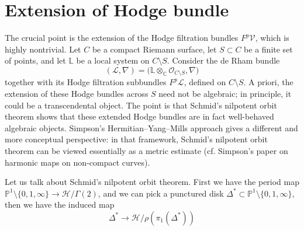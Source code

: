 \documentclass[11pt]{article}
\theoremstyle{definition}
\newtheorem{theorem}{Theorem}
\newcommand\PP{{\mathbb{P}}}
\begin{document}



\section{Extension of Hodge bundle}
The crucial point is the extension of the Hodge filtration bundles $F^p\mathcal{V}$, which is highly nontrivial. Let $C$ be a compact Riemann surface, let $S \subset C$ be a finite set of points, and let $\mathbb{L}$ be a local system on $C \setminus S$. Consider the de Rham bundle $$(\mathcal{L},\nabla)=\bigl(\mathbb{L}\otimes_{\mathbb C}\mathcal{O}_{C\setminus S},\nabla\bigr)$$
together with its Hodge filtration subbundles $F^p\mathcal{L}$, defined on $C\setminus S$. A priori, the extension of these Hodge bundles across $S$ need not be algebraic; in principle, it could be a transcendental object. The point is that Schmid's nilpotent orbit theorem shows that these extended Hodge bundles are in fact well-behaved algebraic objects. Simpson's Hermitian--Yang--Mills approach gives a different and more conceptual perspective: in that framework, Schmid's nilpotent orbit theorem can be viewed essentially as a metric estimate (cf. Simpson's paper on harmonic maps on non-compact curves).


Let us talk about Schmid's nilpotent orbit theorem. First we have the period map $\PP^1 \setminus\{0,1,\infty\} \to \mathscr{H}/ \Gamma(2)$, and we can pick a punctured disk $\Delta^* \subset \PP^1 \setminus \{0,1, \infty\}$, then we have the induced map $$\Delta^* \to \mathscr{H}/\rho(\pi_1(\Delta^*))$$
\end{document}

